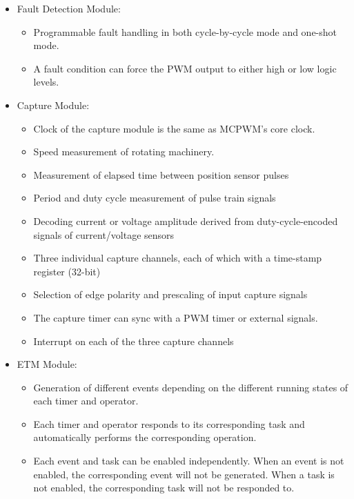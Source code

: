 \documentclass[main\_\_EN.tex]{subfiles}
\begin{document}
\begin{itemize}
    \item Fault Detection Module:
        \begin{itemize} 
            \item Programmable fault handling in both cycle-by-cycle mode and one-shot mode.
            \item A fault condition can force the PWM output to either high or low logic levels.
        \end{itemize}
    \item Capture Module:
        \begin{itemize}
            \item Clock of the capture module is the same as MCPWM's core clock.
            \item Speed measurement of rotating machinery.
            \item Measurement of elapsed time between position sensor pulses
            \item Period and duty cycle measurement of pulse train signals
            \item Decoding current or voltage amplitude derived from duty-cycle-encoded signals of current/voltage sensors
            \item Three individual capture channels, each of which with a time-stamp register (32-bit)
            \item Selection of edge polarity and prescaling of input capture signals
            \item The capture timer can sync with a PWM timer or external signals.
            \item Interrupt on each of the three capture channels
        \end{itemize}
    \item ETM Module:
        \begin{itemize}
            \item Generation of different events depending on the different running states of each timer and operator.
            \item Each timer and operator responds to its corresponding task and automatically performs the corresponding operation.
            \item Each event and task can be enabled independently. When an event is not enabled, the corresponding event will not be generated. When a task is not enabled, the corresponding task will not be responded to.
        \end{itemize}
\end{itemize}
\clearpage
\end{document}
